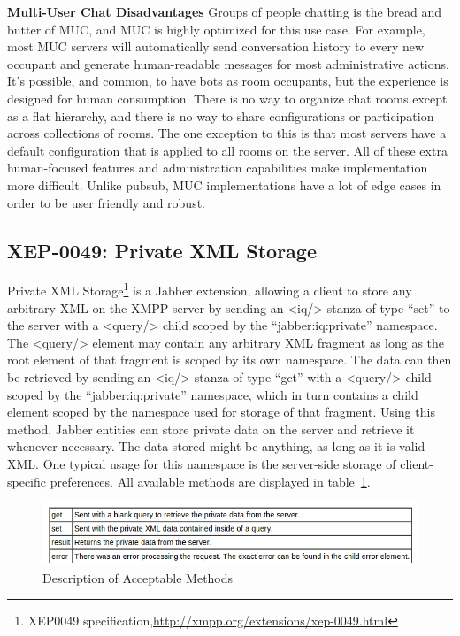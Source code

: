 	\textbf{Multi-User Chat Disadvantages}
	\newline
	Groups of people chatting is the bread and butter of MUC, and MUC is highly optimized for this use case. For example, most MUC servers will automatically send conversation history to every new occupant and generate human-readable messages for most administrative actions. It's possible, and common, to have bots as room occupants, but the experience is designed for human consumption. There is no way to organize chat rooms except as a flat hierarchy, and there is no way to share configurations or participation across collections of rooms. The one exception to this is that most servers have a default configuration that is applied to all rooms on the server. All of these extra human-focused features and administration capabilities make implementation more difficult. Unlike pubsub, MUC implementations have a lot of edge cases in order to be user friendly and robust.


\subsection{XEP-0049: Private XML Storage}
	Private XML Storage\footnote{XEP0049 specification,\url{http://xmpp.org/extensions/xep-0049.html}} is a Jabber extension, allowing a client to store any arbitrary XML on the XMPP server by sending an <iq/> stanza of type ``set'' to the server with a <query/> child scoped by the ``jabber:iq:private'' namespace. The <query/> element may contain any arbitrary XML fragment as long as the root element of that fragment is scoped by its own namespace. The data can then be retrieved by sending an <iq/> stanza of type ``get'' with a <query/> child scoped by the ``jabber:iq:private'' namespace, which in turn contains a child element scoped by the namespace used for storage of that fragment. Using this method, Jabber entities can store private data on the server and retrieve it whenever necessary. The data stored might be anything, as long as it is valid XML. One typical usage for this namespace is the server-side storage of client-specific preferences. All available methods are displayed in table~\ref{img:xep49-methods}.
	
	\begin{figure}[!ht]
		\centering
		\includegraphics[scale=0.9]{images/xep0049Queries.png}   
		\caption[ Description of Acceptable Methods]{Description of Acceptable Methods}
		\label{img:xep49-methods}
		\end{figure}

